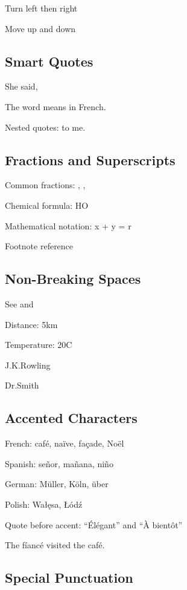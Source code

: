 \documentclass[11pt]{article}
\begin{document}
Turn left \larrow then right \rarrow

Move up \uarrow and down \darrow

\subsection{Smart Quotes}

She said, 

The word  means  in French.

Nested quotes:  to me.

\subsection{Fractions and Superscripts}

Common fractions: \half, \quarter, \threequarters

Chemical formula: HO

Mathematical notation: x + y = r

Footnote reference

\subsection{Non-Breaking Spaces}

See  and 

Distance: \unit{5}{km}

Temperature: \unit{20}{\degrees C}

J.\initialspace K.\initialspace Rowling

Dr.\abbrspace Smith

\subsection{Accented Characters}

French: café, naïve, façade, Noël

Spanish: señor, mañana, niño

German: Müller, Köln, über

Polish: Wałęsa, Łódź

Quote before accent: ``Élégant'' and ``À bientôt''

The f\'iancé visited the caf\'e.

\subsection{Special Punctuation}
\end{document}
